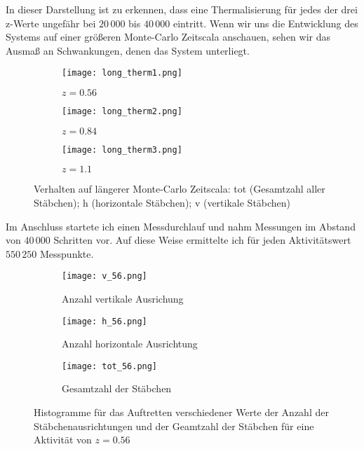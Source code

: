 \documentclass[12pt]{article}
\begin{document}
In dieser Darstellung ist zu erkennen, dass eine Thermalisierung für jedes der drei z-Werte ungefähr bei $20\,000$ bis $40\,000$ eintritt. Wenn wir uns die Entwicklung des Systems auf einer größeren Monte-Carlo Zeitscala anschauen, sehen wir das Ausmaß an Schwankungen, denen das System unterliegt.
\begin{figure}[H]\hspace*{-1.5cm}
    \begin{subfigure}{0.4\textwidth}
    \texttt{[image: long\_therm1.png]}
    \caption{$z=0.56$}
    \end{subfigure}
    \hfill
    \begin{subfigure}{0.4\textwidth}
    \hspace*{-0.8cm}
    \texttt{[image: long\_therm2.png]}
    \caption{$z=0.84$}
    \end{subfigure}
    \hfill
    \hspace*{-1.5cm}
    \begin{subfigure}{0.4\textwidth}
    \texttt{[image: long\_therm3.png]}
    \caption{$z=1.1$}
    \end{subfigure}
    \hfill
    \caption{Verhalten auf längerer Monte-Carlo Zeitscala: tot (Gesamtzahl aller Stäbchen); h (horizontale Stäbchen); v (vertikale Stäbchen) }
    \end{figure}
Im Anschluss startete ich einen Messdurchlauf und nahm Messungen im Abstand von $40\,000$ Schritten vor. Auf diese Weise ermittelte ich für jeden Aktivitätswert $550\,250$ Messpunkte. 
\begin{figure}[H]\hspace*{-1.5cm}
    \begin{subfigure}{0.4\textwidth}
    \texttt{[image: v\_56.png]}
    \caption{Anzahl vertikale Ausrichung\newline
    }
    \end{subfigure}
    \hfill
    \begin{subfigure}{0.4\textwidth}
    \hspace*{-0.8cm}
    \texttt{[image: h\_56.png]}
    \caption{Anzahl horizontale Ausrichtung}
    \end{subfigure}
    \hfill
    \hspace*{-1.5cm}
    \begin{subfigure}{0.4\textwidth}
    \texttt{[image: tot\_56.png]}
    \caption{Gesamtzahl der Stäbchen}
    \end{subfigure}
    \hfill
    \caption{Histogramme für das Auftretten verschiedener Werte der Anzahl der Stäbchenausrichtungen und der Geamtzahl der Stäbchen für eine Aktivität von $z=0.56$}
    \end{figure}
\end{document}
